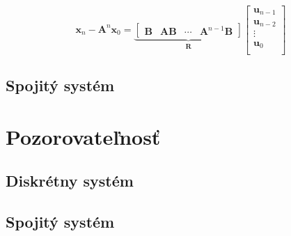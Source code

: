 \documentclass[a4paper, 10pt, ]{article}
\begin{document}
\begin{equation}
    \bm{x}_{n} - \bm{A}^{n} \bm{x}_{0} = 
    \underbrace{
        \begin{bmatrix}
            \bm{B} & \bm{A} \bm{B} & \cdots & \bm{A}^{n - 1} \bm{B}
        \end{bmatrix}
    }_{\bm{R}}
    \begin{bmatrix}
        \bm{u}_{n - 1} \\
        \bm{u}_{n - 2} \\
        \vdots     \\
        \bm{u}_{0} \\
    \end{bmatrix}
\end{equation}



\subsection{Spojitý systém}



\section{Pozorovateľnosť}


\subsection{Diskrétny systém}

\subsection{Spojitý systém}
\end{document}
